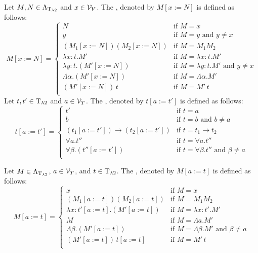 \begin{definition}\label{def.2.2}
	Let $M,N\in\Lambda_{\text{T}_{\lambda2}}$ and $x\in\mathcal{V}_V$. The , denoted by $M\left[x:=N\right]$ is defined as follows:
	\[M\left[x:=N\right]=
		\begin{cases}
			N                     & \text{if $M=x$}                \\
			y                     & \text{if $M=y$ and $y\neq x$}  \\
			(M_1\left[x:=N\right])(M_2\left[x:=N\right])  & \text{if $M=M_1M_2$}           \\
			\lambda x:t.M'        & \text{if $M=\lambda x:t.M'$}   \\
			\lambda y:t.(M'\left[x:=N\right])             & \text{if $M=\lambda y:t.M'$ and $y\neq x$}   \\
			\Lambda\alpha.(M'\left[x:=N\right])           & \text{if $M=\Lambda\alpha.M'$} \\
			(M'\left[x:=N\right])\,t                      & \text{if $M=M'\,t$}            \\
		\end{cases}\]
	Let $t,t'\in\text{T}_{\lambda2}$ and $a\in\mathcal{V}_T$. The , denoted by $t\left[a:=t'\right]$ is defined as follows:
	\[t\left[a:=t'\right]=
		\begin{cases}
			t'                    & \text{if $t=a$}                    \\ 
			b                     & \text{if $t=b$ and $b\neq a$}      \\ 
			(t_1\left[a:=t'\right])\to (t_2\left[a:=t'\right])  & \text{if $t=t_1\to t_2$}           \\
			\forall a.t''         & \text{if $t=\forall a.t''$}\\
			\forall\beta.(t''\left[a:=t'\right]) & \text{if $t=\forall\beta.t''$ and $\beta\neq a$}\\
		\end{cases}\]
		
	Let $M\in\Lambda_{\text{T}_{\lambda2}}$, $a\in\mathcal{V}_T$, and $t\in\text{T}_{\lambda2}$. The , denoted by $M\left[a:=t\right]$ is defined as follows:
	\[M\left[a:=t\right]=
		\begin{cases}
			x                                             & \text{if $M=x$}  \\
			(M_1\left[a:=t\right])(M_2\left[a:=t\right])  & \text{if $M=M_1M_2$}           \\
			\lambda x:t'\left[a:=t\right].(M'\left[a:=t\right])             & \text{if $M=\lambda x:t'.M'$}   \\
			M                                             & \text{if $M=\Lambda a.M'$} \\
			\Lambda\beta.(M'\left[a:=t\right])           & \text{if $M=\Lambda\beta.M'$ and $\beta\neq a$} \\
			(M'\left[a:=t\right])\,t\left[a:=t\right]     & \text{if $M=M'\,t$}            \\
		\end{cases}\]
\end{definition}

